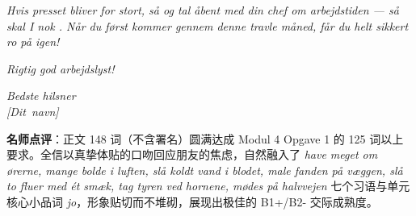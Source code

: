 \begin{answerbox}
\textit{Hvis presset bliver for stort, så  og tal åbent med din chef om arbejdstiden --- så skal I nok . Når du først kommer gennem denne travle måned, får du helt sikkert ro på igen!}

\textit{Rigtig god arbejdslyst!}

\textit{Bedste hilsner\\
\mbox{[Dit navn]}}

\small\textbf{名师点评}：正文 148 词（不含署名）圆满达成 Modul 4 Opgave 1 的 125 词以上要求。全信以真挚体贴的口吻回应朋友的焦虑，自然融入了 \textit{have meget om ørerne, mange bolde i luften, slå koldt vand i blodet, male fanden på væggen, slå to fluer med ét smæk, tag tyren ved hornene, mødes på halvvejen} 七个习语与单元核心小品词 \textit{jo}，形象贴切而不堆砌，展现出极佳的 B1+/B2- 交际成熟度。
\end{answerbox}